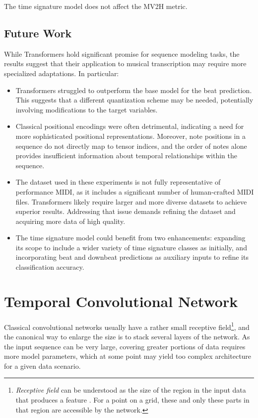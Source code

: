 The time signature model does not affect the MV2H metric.

\subsection{Future Work}

While Transformers hold significant promise for sequence modeling tasks, the results suggest that their application to musical transcription may require more specialized adaptations. In particular: \begin{itemize}
	\item Transformers struggled to outperform the base model for the beat prediction. This suggests that a different quantization scheme may be needed, potentially involving modifications to the target variables.
	\item Classical positional encodings were often detrimental, indicating a need for more sophisticated positional representations. Moreover, note positions in a sequence do not directly map to tensor indices, and the order of notes alone provides insufficient information about temporal relationships within the sequence.
	\item The dataset used in these experiments is not fully representative of performance MIDI, as it includes a significant number of human-crafted MIDI files. Transformers likely require larger and more diverse datasets to achieve superior results. Addressing that issue demands refining the dataset and acquiring more data of high quality.
	\item The time signature model could benefit from two enhancements: expanding its scope to include a wider variety of time signature classes as initially, and incorporating beat and downbeat predictions as auxiliary inputs to refine its classification accuracy.
\end{itemize}

\section{Temporal Convolutional Network}

Classical convolutional networks usually have a rather small receptive field\footnote{\emph{Receptive field} can be understood as the size of the region in the input data that produces a feature \cite{Araujo2019}. For a point on a grid, these and only these parts in that region are accessible by the network.}, and the canonical way to enlarge the size is to stack several layers of the network. As the input sequence can be very large, covering greater portions of data requires more model parameters, which at some point may yield too complex architecture for a given data scenario.

